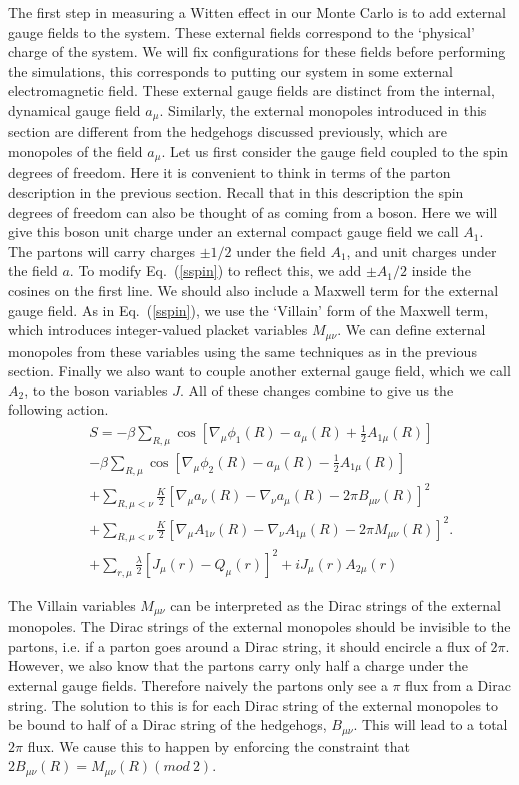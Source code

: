 \documentclass[prb,twocolumn]{revtex4-1}
\begin{document}
The first step in measuring a Witten effect in our Monte Carlo is to add external gauge fields to the system. These external fields correspond to the `physical' charge of the system. We will fix configurations for these fields before performing the simulations, this corresponds to putting our system in some external electromagnetic field. These external gauge fields are distinct from the internal, dynamical gauge field $a_\mu$. Similarly, the external monopoles introduced in this section are different from the hedgehogs discussed previously, which are monopoles of the field $a_\mu$.
Let us first consider the gauge field coupled to the spin degrees of freedom. Here it is convenient to think in terms of the parton description in the previous section. Recall that in this description the spin degrees of freedom can also be thought of as coming from a boson. Here we will give this boson unit charge under an external compact gauge field we call $A_1$. The partons will carry charges $\pm 1/2$ under the field $A_1$, and unit charges under the field $a$. To modify Eq.~(\ref{sspin}) to reflect this, we add $\pm A_1/2$ inside the cosines on the first line. We should also include a Maxwell term for the external gauge field. As in Eq.~(\ref{sspin}), we use the `Villain' form of the Maxwell term, which introduces integer-valued placket variables $M_{\mu\nu}$. We can define external monopoles from these variables using the same techniques as in the previous section. Finally we also want to couple another external gauge field, which we call $A_2$, to the boson variables $J$. All of these changes combine to give us the following action. 
\begin{eqnarray}
&&S=-\beta\sum_{R,\mu} \cos[\nabla_\mu\phi_1(R)-a_\mu(R)+\frac{1}{2}A_{1\mu}(R)]\nonumber\\
&&-\beta\sum_{R,\mu} \cos[\nabla_\mu\phi_2(R)-a_\mu(R)-\frac{1}{2}A_{1\mu}(R)]\nonumber\\
&&+\sum_{R,\mu<\nu}\frac{K}{2}\left[\nabla_\mu a_\nu(R)-\nabla_\nu a_\mu(R)-2\pi B_{\mu\nu}(R)\right]^2\nonumber\\
&&+\sum_{R,\mu<\nu}\frac{K}{2}\left[\nabla_\mu A_{1\nu}(R)-\nabla_\nu A_{1\mu}(R)-2\pi M_{\mu\nu}(R)\right]^2.\nonumber\\
&&+\sum_{r,\mu} \frac{\lambda}{2}[ J_\mu(r)- Q_\mu(r)]^2+iJ_{\mu}(r)A_{2\mu}(r)
\label{withA}
\end{eqnarray}

The Villain variables $M_{\mu\nu}$ can be interpreted as the Dirac strings of the external monopoles. The Dirac strings of the external monopoles should be invisible to the partons, i.e. if a parton goes around a Dirac string, it should encircle a flux of $2\pi$. However, we also know that the partons carry only half a charge under the external gauge fields. Therefore naively the partons only see a $\pi$ flux from a Dirac string. The solution to this is for each Dirac string of the external monopoles to be bound to half of a Dirac string of the hedgehogs, $B_{\mu\nu}$. This will lead to a total $2\pi$ flux. We cause this to happen by enforcing the constraint that $2B_{\mu\nu}(R)=M_{\mu\nu}(R) (mod~2)$. 
\end{document}
